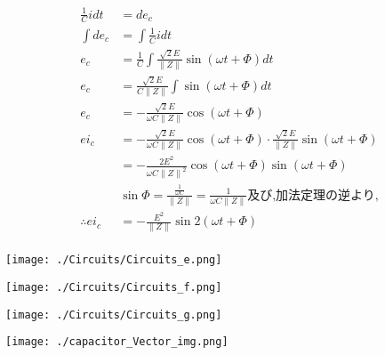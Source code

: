 \documentclass[twocolumn]{article}
\begin{document}
\begin{enumerate}
\begin{align*}
            \frac{1}{C} i dt &= de_c\\
            \int de_c &= \int \frac{1}{C} i dt\\
            e_c &=  \frac{1}{C} \int \frac{\sqrt{2}E}{\|Z\|} \sin\left(\omega t + \Phi\right)dt\\
            e_c &=  \frac{\sqrt{2}E}{C \|Z\|} \int \sin\left(\omega t + \Phi\right)dt\\
            e_c &=  -\frac{\sqrt{2}E}{\omega C \|Z\|} \cos\left(\omega t + \Phi\right)\\
            ei_c  &= -\frac{\sqrt{2}E}{\omega C \|Z\|} \cos\left(\omega t + \Phi\right) \cdot \frac{\sqrt{2}E}{\|Z\|}\sin\left(\omega t + \Phi\right)\\
                  &= -\frac{2E^2}{\omega C {\|Z\|}^2} \cos\left(\omega t + \Phi\right) \sin\left(\omega t + \Phi\right)\\
                  &\sin\Phi = \frac{\frac{1}{\omega C}}{\|Z\|} = \frac{1}{\omega C \|Z\|} \text{及び,加法定理の逆より,}\\
\therefore ei_c   &= -\frac{E^2}{\|Z\|} \sin2\left(\omega t + \Phi\right)\\
        \end{align*}

        \begin{center}
            \texttt{[image: ./Circuits/Circuits\_e.png]}
          \end{center}
          \begin{center}
            \texttt{[image: ./Circuits/Circuits\_f.png]}
          \end{center}
          \begin{center}
            \texttt{[image: ./Circuits/Circuits\_g.png]}
          \end{center}

        \begin{center}
          \texttt{[image: ./capacitor\_Vector\_img.png]}
        \end{center}


\end{enumerate}
\end{document}
